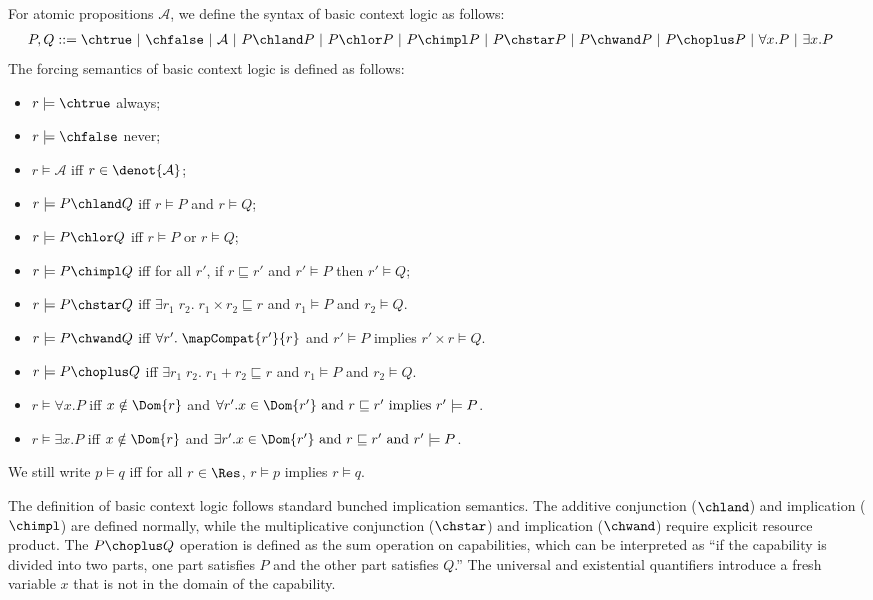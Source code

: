 \begin{definition}\label{def:basic-context-logic} For atomic propositions $\mathcal{A}$, we define the syntax of basic context logic as follows:
  \begin{align*}
    P, Q &::= \chtrue ~|~ \chfalse ~|~ \mathcal{A} ~|~ P \chland P ~|~ P \chlor P ~|~ P \chimpl P ~|~ P \chstar P ~|~ P \chwand P ~|~ P \choplus P ~|~ \forall x. P ~|~ \exists x. P
  \end{align*}
The forcing semantics of basic context logic is defined as follows:
\begin{itemize}
\item $r \models \chtrue$ always;
\item $r \models \chfalse$ never;
\item $r \models \mathcal{A}$ iff $r \in \denot{\mathcal{A}}$;
\item $r \models P \chland Q$ iff $r \models P$ and $r \models Q$;
\item $r \models P \chlor Q$ iff $r \models P$ or $r \models Q$;
\item $r \models P \chimpl Q$ iff for all $r'$, if $r \sqsubseteq r'$ and $r' \models P$ then $r' \models Q$;
\item $r \models P \chstar Q$ iff $\exists r_1\;r_2.\; r_1 \times r_2 \sqsubseteq r$ and
  $r_1 \models P$ and $r_2 \models Q$.
\item $r \models P \chwand Q$ iff $\forall r'.\; \mapCompat{r'}{r}$ and $r' \models P$ implies
  $r' \times r \models Q$.
\item $r \models P \choplus Q$ iff $\exists r_1\;r_2.\; r_1 + r_2 \sqsubseteq r$ and
  $r_1 \models P$ and $r_2 \models Q$.
\item $r \models \forall x.P$ iff $x\notin \Dom{r}$ and $\forall r'. x\in \Dom{r'} \text{ and }r \sqsubseteq r' \text{ implies } r' \models P$.
\item $r \models \exists x.P$ iff $x\notin \Dom{r}$ and $\exists r'. x\in \Dom{r'} \text{ and }r \sqsubseteq r' \text{ and } r' \models P$.
\end{itemize}
We still write $p \models q$ iff for all $r \in \Res$, $r \models p$ implies $r \models q$.
\end{definition}

The definition of basic context logic follows standard bunched implication semantics. The additive conjunction ($\chland$) and implication ($\chimpl$) are defined normally, while the multiplicative conjunction ($\chstar$) and implication ($\chwand$) require explicit resource product. The $P \choplus Q$ operation is defined as the sum operation on capabilities, which can be interpreted as ``if the capability is divided into two parts, one part satisfies $P$ and the other part satisfies $Q$.'' The universal and existential quantifiers introduce a fresh variable $x$ that is not in the domain of the capability.

